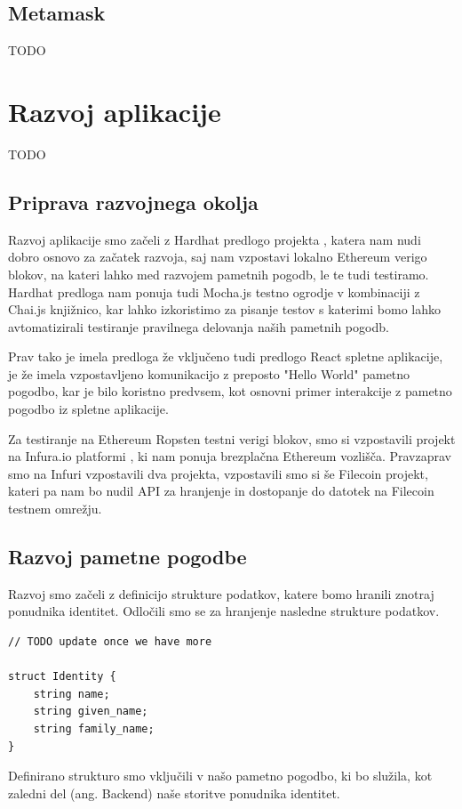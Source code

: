 \documentclass[a4paper,12pt,openright]{book}
\begin{document}
\section{Metamask}
TODO


\chapter{Razvoj aplikacije}
TODO

\section{Priprava razvojnega okolja}
Razvoj aplikacije smo začeli z Hardhat predlogo projekta \cite{hardhat_react_boilerplate}, katera nam nudi dobro osnovo
za začatek razvoja, saj nam vzpostavi lokalno Ethereum verigo blokov, na kateri lahko med razvojem pametnih pogodb,
le te tudi testiramo.
Hardhat predloga nam ponuja tudi Mocha.js testno ogrodje v kombinaciji z Chai.js knjižnico, kar lahko izkoristimo 
za pisanje testov s katerimi bomo lahko avtomatizirali testiranje pravilnega delovanja naših pametnih pogodb.

Prav tako je imela predloga že vključeno tudi predlogo React spletne aplikacije, je že imela vzpostavljeno komunikacijo z 
preposto "Hello World" pametno pogodbo, kar je bilo koristno predvsem, kot osnovni primer interakcije z pametno pogodbo
iz spletne aplikacije.

Za testiranje na Ethereum Ropsten testni verigi blokov, smo si vzpostavili projekt na Infura.io platformi \cite{infura}, ki nam 
ponuja brezplačna Ethereum vozlišča. Pravzaprav smo na Infuri vzpostavili dva projekta, vzpostavili smo si še Filecoin projekt,
kateri pa nam bo nudil API za hranjenje in dostopanje do datotek na Filecoin testnem omrežju.

\section{Razvoj pametne pogodbe}
Razvoj smo začeli z definicijo strukture podatkov, katere bomo hranili znotraj ponudnika identitet.
Odločili smo se za hranjenje nasledne strukture podatkov.

\begin{verbatim}
// TODO update once we have more

struct Identity {
    string name;
    string given_name;
    string family_name;
}
\end{verbatim}

Definirano strukturo smo vključili v našo pametno pogodbo, ki bo služila, kot zaledni del (ang. Backend) naše storitve ponudnika identitet.
\end{document}
